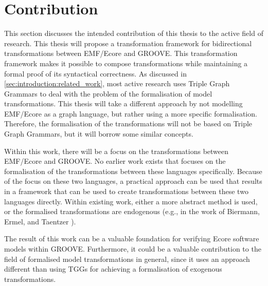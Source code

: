\section{Contribution}
\label{sec:introduction:contribution}

This section discusses the intended contribution of this thesis to the active field of research. This thesis will propose a transformation framework for bidirectional transformations between EMF/Ecore and GROOVE. This transformation framework makes it possible to compose transformations while maintaining a formal proof of its syntactical correctness. As discussed in \cref{sec:introduction:related_work}, most active research uses Triple Graph Grammars to deal with the problem of the formalisation of model transformations. This thesis will take a different approach by not modelling EMF/Ecore as a graph language, but rather using a more specific formalisation. Therefore, the formalisation of the transformations will not be based on Triple Graph Grammars, but it will borrow some similar concepts.

Within this work, there will be a focus on the transformations between EMF/Ecore and GROOVE. No earlier work exists that focuses on the formalisation of the transformations between these languages specifically. Because of the focus on these two languages, a practical approach can be used that results in a framework that can be used to create transformations between these two languages directly. Within existing work, either a more abstract method is used, or the formalised transformations are endogenous (e.g., in the work of Biermann, Ermel, and Taentzer \cite{biermann_ermel_taentzer_2011}).

The result of this work can be a valuable foundation for verifying Ecore software models within GROOVE. Furthermore, it could be a valuable contribution to the field of formalised model transformations in general, since it uses an approach different than using TGGs for achieving a formalisation of exogenous transformations.